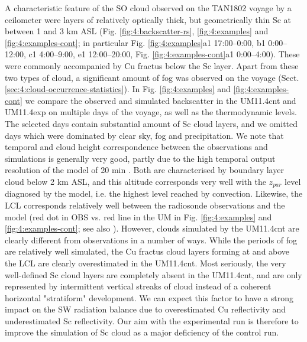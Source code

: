 A characteristic feature of the SO cloud observed on the TAN1802 voyage
by a ceilometer
were layers of relatively optically thick, but geometrically thin Sc
at between 1 and 3 km ASL (Fig. \ref{fig:4:backscatter-rs}, \ref{fig:4:examples}
and
\ref{fig:4:examples-cont}; in particular Fig. \ref{fig:4:examples}a1 17:00--0:00, b1 0:00--12:00, c1
4:00--9:00, e1 12:00--20:00, Fig. \ref{fig:4:examples-cont}a1 0:00--4:00).
These were commonly accompanied by Cu fractus
below the Sc layer. 
Apart from these two types of cloud, a significant amount
of fog was observed on the voyage (Sect. \ref{sec:4:cloud-occurrence-statistics}).
In Fig. \ref{fig:4:examples} and \ref{fig:4:examples-cont} we compare the
observed and simulated backscatter in the UM11.4cnt and UM11.4exp on
multiple days of the voyage, as well as the thermodynamic levels.
The selected days contain substantial amount of Sc cloud layers,
and we omitted days which were dominated by clear sky, fog and precipitation.
We note that
temporal and cloud height correspondence between the observations and simulations
is generally very good, partly due to the high temporal output resolution of
the model of 20 min \citep{kuma2020b}. Both are characterised by boundary
layer cloud below 2 km ASL, and this altitude corresponds very well with
the $z_{par}$ level diagnosed by the model, i.e. the highest level reached
by convection. Likewise, the LCL corresponds relatively well between the
radiosonde observations and the model (red dot in OBS vs. red line in the UM
in Fig. \ref{fig:4:examples} and \ref{fig:4:examples-cont}; see also \cite{kuma2020a}).
However, clouds simulated by the
UM11.4cnt are clearly different from observations in a number of ways.
While the periods of fog are relatively well simulated, the Cu fractus
cloud layers forming at and above the LCL are clearly overestimated in the
UM11.4cnt. Most seriously, the very well-defined Sc cloud layers are
completely absent in the UM11.4cnt, and are only represented by
intermittent vertical streaks of cloud instead of a coherent horizontal 
"stratiform" development. We can expect this factor to have a strong
impact on the SW radiation balance due to overestimated Cu reflectivity
and underestimated Sc reflectivity. Our aim with the experimental run is
therefore to improve
the simulation of Sc cloud as a major deficiency of the control run.

